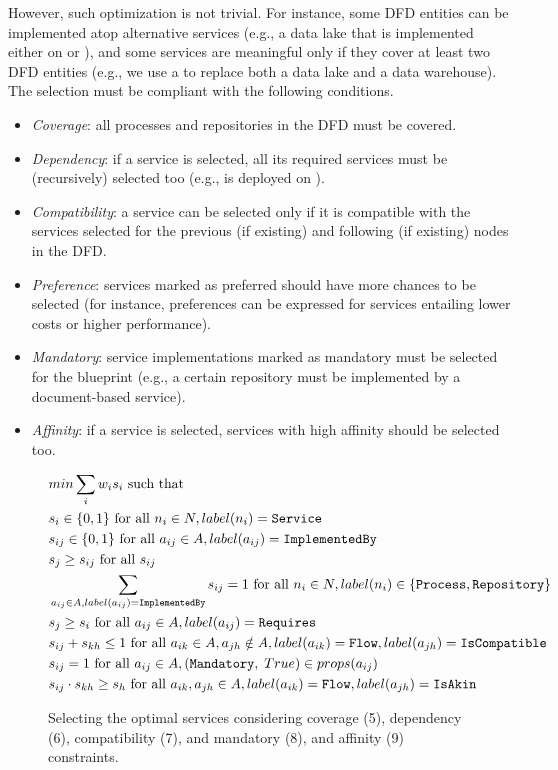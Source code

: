However, such optimization is not trivial. For instance, some DFD entities can be implemented atop alternative services (e.g., a data lake that is implemented either on  or ), and some services are meaningful only if they cover at least two DFD entities (e.g., we use a  to replace both a data lake and a data warehouse). The selection must be compliant with the following conditions.
\begin{itemize}
    \item \textit{Coverage}: all processes and repositories in the DFD must be covered.
    \item \textit{Dependency}: if a service is selected, all its required services must be (recursively) selected too (e.g.,  is deployed on ).
    \item \textit{Compatibility}: a service can be selected only if it is compatible with the services selected for the previous (if existing) and following (if existing) nodes in the DFD.
    \item \textit{Preference}: services marked as preferred should have more chances to be selected (for instance, preferences can be expressed for services entailing lower costs or higher performance).
    \item \textit{Mandatory}: service implementations marked as mandatory must be selected for the blueprint (e.g., a certain repository must be implemented by a document-based service).
    \item \textit{Affinity}: if a service is selected, services with high affinity should be selected too.
\end{itemize}

\begin{figure}[htbp]
{\footnotesize
\begin{align}
&min \sum_i w_i s_i \textup{ such that }\\
&s_i \in \{0,1\} \textup{ for all } n_i \in N, label(n_i) = \texttt{Service}\\
&s_{ij} \in \{0,1\} \textup{ for all } a_{ij} \in A, label(a_{ij})= \texttt{ImplementedBy}\\
&s_j \geq s_{ij} \textup{ for all } s_{ij}\\
&\sum_{a_{ij} \in A, label(a_{ij})=\texttt{ImplementedBy}} s_{ij}=1  \textup{ for all } n_i \in N, label(n_i) \in \{\texttt{Process}, \texttt{Repository}\}\\
&s_j\geq s_i  \textup{ for all } a_{ij} \in A, label(a_{ij})= \texttt{Requires} \\
&s_{ij}+s_{kh} \leq 1  \textup{ for all } a_{ik} \in A, a_{jh} \notin A, label(a_{ik})=\texttt{Flow}, label(a_{jh})=\texttt{IsCompatible}\\
&s_{ij} = 1 \textup{ for all } a_{ij} \in A, (\texttt{Mandatory},\;True) \in props(a_{ij})\\
&s_{ij} \cdot s_{kh} \geq s_{h} \textup{ for all } a_{ik}, a_{jh} \in A, label(a_{ik})=\texttt{Flow}, label(a_{jh})=\texttt{IsAkin}
\end{align}
}
\caption{Selecting the optimal services considering coverage (5), dependency (6), compatibility (7), and mandatory (8), and affinity (9) constraints.}
\label{fig:pdd-form}
\end{figure}

